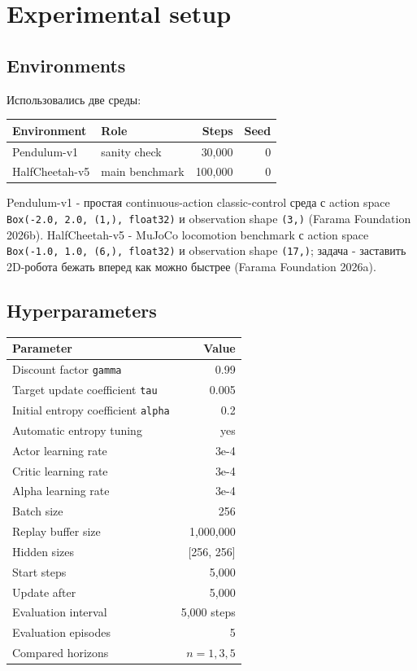 \documentclass[
  russian,
]{article}
\begin{document}
\section{Experimental setup}\label{experimental-setup}

\subsection{Environments}\label{environments}

Использовались две среды:

\begin{longtable}[]{@{}llrr@{}}
\toprule\noalign{}
Environment & Role & Steps & Seed \\
\midrule\noalign{}
\endhead
\bottomrule\noalign{}
\endlastfoot
Pendulum-v1 & sanity check & 30,000 & 0 \\
HalfCheetah-v5 & main benchmark & 100,000 & 0 \\
\end{longtable}

Pendulum-v1 - простая continuous-action classic-control среда с action
space \texttt{Box(-2.0,\ 2.0,\ (1,),\ float32)} и observation shape
\texttt{(3,)} (Farama Foundation 2026b). HalfCheetah-v5 - MuJoCo
locomotion benchmark с action space
\texttt{Box(-1.0,\ 1.0,\ (6,),\ float32)} и observation shape
\texttt{(17,)}; задача - заставить 2D-робота бежать вперед как можно
быстрее (Farama Foundation 2026a).

\subsection{Hyperparameters}\label{hyperparameters}

\begin{longtable}[]{@{}lr@{}}
\toprule\noalign{}
Parameter & Value \\
\midrule\noalign{}
\endhead
\bottomrule\noalign{}
\endlastfoot
Discount factor \texttt{gamma} & 0.99 \\
Target update coefficient \texttt{tau} & 0.005 \\
Initial entropy coefficient \texttt{alpha} & 0.2 \\
Automatic entropy tuning & yes \\
Actor learning rate & 3e-4 \\
Critic learning rate & 3e-4 \\
Alpha learning rate & 3e-4 \\
Batch size & 256 \\
Replay buffer size & 1,000,000 \\
Hidden sizes & {[}256, 256{]} \\
Start steps & 5,000 \\
Update after & 5,000 \\
Evaluation interval & 5,000 steps \\
Evaluation episodes & 5 \\
Compared horizons & \(n=1,3,5\) \\
\end{longtable}
\end{document}
